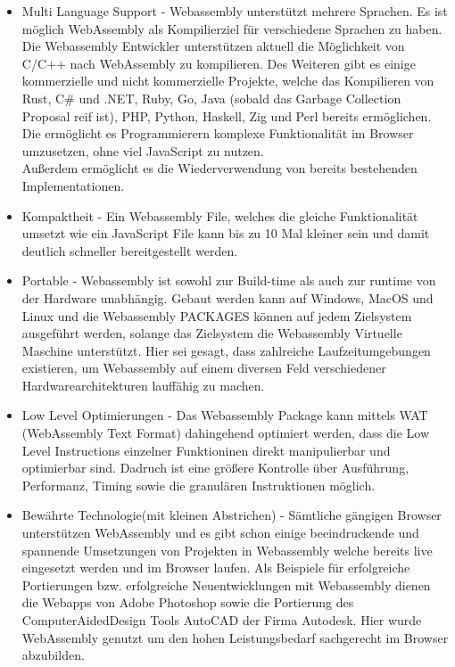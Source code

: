 \begin{itemize}
    \item   Multi Language Support - Webassembly unterstützt mehrere Sprachen. Es ist möglich WebAssembly als Kompilierziel für verschiedene Sprachen zu haben. \\
            Die Webassembly Entwickler unterstützen aktuell die Möglichkeit von C/C++ nach WebAssembly zu kompilieren. Des Weiteren gibt es einige kommerzielle und nicht kommerzielle
            Projekte, welche das Kompilieren von Rust, C\# und .NET, Ruby, Go, Java (sobald das Garbage Collection Proposal reif ist), PHP, Python, Haskell, Zig und Perl bereits ermöglichen.\\
            Die ermöglicht es Programmierern komplexe Funktionalität im Browser umzusetzen, ohne viel JavaScript zu nutzen. \\
            Außerdem ermöglicht es die Wiederverwendung von bereits bestehenden Implementationen.
    \item   Kompaktheit - Ein Webassembly File, welches die gleiche Funktionalität umsetzt wie ein JavaScript File kann bis zu 10 Mal kleiner sein und damit deutlich schneller bereitgestellt werden.
    \item   Portable - Webassembly ist sowohl zur Build-time als auch zur runtime von der Hardware unabhängig. Gebaut werden kann auf Windows, MacOS und Linux und die Webassembly PACKAGES
            können auf jedem Zielsystem ausgeführt werden, solange das Zielsystem die Webassembly Virtuelle Maschine unterstützt. Hier sei gesagt, dass zahlreiche Laufzeitumgebungen existieren, um 
            Webassembly auf einem diversen Feld verschiedener Hardwarearchitekturen lauffähig zu machen. 
    \item   Low Level Optimierungen - Das Webassembly Package kann mittels WAT (WebAssembly Text Format) dahingehend optimiert werden, dass die Low Level Instructions einzelner Funktioninen
            direkt manipulierbar und optimierbar sind. Dadruch ist eine größere Kontrolle über Ausführung, Performanz, Timing sowie die granulären Instruktionen möglich.
    \item   Bewährte Technologie(mit kleinen Abstrichen) - Sämtliche gängigen Browser unterstützen WebAssembly und es gibt schon einige beeindruckende und spannende Umsetzungen von Projekten in Webassembly
            welche bereits live eingesetzt werden und im Browser laufen. Als Beispiele für erfolgreiche Portierungen bzw. erfolgreiche Neuentwicklungen mit Webassembly dienen die Webapps von
            Adobe Photoshop sowie die Portierung des ComputerAidedDesign Tools AutoCAD der Firma Autodesk. Hier wurde WebAssembly genutzt um den hohen Leistungsbedarf sachgerecht im Browser abzubilden.

\end{itemize}
